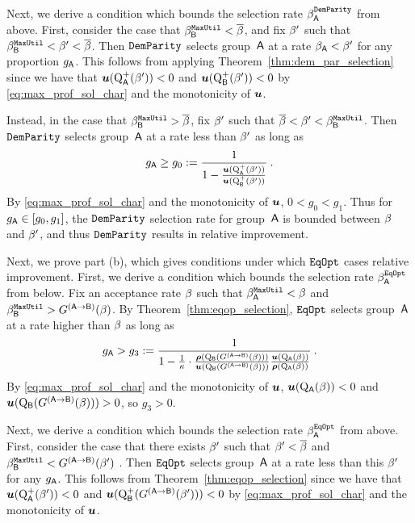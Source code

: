 		Next, we derive a condition which bounds the selection rate $\beta^{\mathtt{DemParity}}_{\mathsf{A}}$ from above. First, consider the case that $\beta_{\mathsf{B}}^{\mathtt{MaxUtil}}<\overline{\beta}$, and fix $\beta'$ such that $\beta_{\mathsf{B}}^{\mathtt{MaxUtil}}<\beta'<\overline{\beta}$. 
		Then $\mathtt{DemParity}$ selects group~$\mathsf{A}$ at a rate $\beta_{\mathsf{A}} < \beta'$ for any proportion $g_{\mathsf{A}}$. This follows from applying Theorem~\ref{thm:dem_par_selection} since we have that  $\boldsymbol{u}(\mathrm{Q}^+_{\mathsf{A}}(\beta'))<0$ and $\boldsymbol{u}(\mathrm{Q}^+_{\mathsf{B}}(\beta'))<0$ by \eqref{eq:max_prof_sol_char} and the monotonicity of $\boldsymbol{u}$. 

		Instead, in the case that $\beta_{\mathsf{B}}^{\mathtt{MaxUtil}}>\overline{\beta}$, fix $\beta'$ such that $\overline{\beta}<\beta'<\beta_{\mathsf{B}}^{\mathtt{MaxUtil}}$. Then $\mathtt{DemParity}$ selects group~$\mathsf{A}$ at a rate less than $\beta'$ as long as 
		\begin{align*}
		g_{\mathsf{A}}\geq g_0:=\frac{1}{1-\frac{\boldsymbol{u}(\mathrm{Q}^+_{\mathsf{A}}(\beta'))}{\boldsymbol{u}(\mathrm{Q}^+_{\mathsf{B}}(\beta'))}}\:.
		\end{align*} 
		By \eqref{eq:max_prof_sol_char} and the monotonicity of $\boldsymbol{u}$, $0<g_0<g_1$. Thus for $g_{\mathsf{A}}\in[g_0,g_1]$, the $\mathtt{DemParity}$ selection rate for group~$\mathsf{A}$ is bounded between $\beta$ and $\beta'$, and thus $\mathtt{DemParity}$ results in relative improvement.

		Next, we prove part (b), which gives conditions under which $\mathtt{EqOpt}$ cases relative improvement. First, we derive a condition which bounds the selection rate $\beta^{\mathtt{EqOpt}}_{\mathsf{A}}$ from below. Fix an acceptance rate $\beta$ such that $\beta_{\mathsf{A}}^{\mathtt{MaxUtil}}<\beta$ and $\beta_{\mathsf{B}}^{\mathtt{MaxUtil}} > G^{(\mathsf{A}\to\mathsf{B})}(\beta)$.  
		By Theorem~\ref{thm:eqop_selection}, $\mathtt{EqOpt}$ selects group~$\mathsf{A}$ at a rate higher than $\beta$ as long as
		\begin{align*}
		g_{\mathsf{A}}>g_3 := \frac{1}{1-\frac{1}{\kappa}\cdot\frac{\boldsymbol{\rho}(\mathrm{Q}_{\mathsf{B}}(G^{(\mathsf{A}\to\mathsf{B})}(\beta)))}{\boldsymbol{u}(\mathrm{Q}_{\mathsf{B}}(G^{(\mathsf{A}\to\mathsf{B})}(\beta)))}\frac{\boldsymbol{u}(\mathrm{Q}_{\mathsf{A}}(\beta))}{\boldsymbol{\rho}(\mathrm{Q}_{\mathsf{A}}(\beta))}}\:.
		\end{align*} 
		By \eqref{eq:max_prof_sol_char} and the monotonicity of $\boldsymbol{u}$, $\boldsymbol{u}(\mathrm{Q}_{\mathsf{A}}(\beta))<0$ and $\boldsymbol{u}(\mathrm{Q}_{\mathsf{B}}(G^{(\mathsf{A}\to\mathsf{B})}(\beta)))>0$, so $g_3>0$.

		Next, we derive a condition which bounds the selection rate $\beta^{\mathtt{EqOpt}}_{\mathsf{A}}$ from above. First, consider the case that there exists $\beta'$ such that $\beta'<\overline{\beta}$ and $\beta_{\mathsf{B}}^{\mathtt{MaxUtil}} < G^{(\mathsf{A}\to\mathsf{B})}(\beta')$ .
		Then $\mathtt{EqOpt}$ selects group~$\mathsf{A}$ at a rate less than this $\beta'$ for any $g_{\mathsf{A}}$. This follows from Theorem~\ref{thm:eqop_selection} since we have that  $\boldsymbol{u}(\mathrm{Q}^+_{\mathsf{A}}(\beta'))<0$ and $\boldsymbol{u}(\mathrm{Q}^+_{\mathsf{B}}(G^{(\mathsf{A}\to\mathsf{B})}(\beta')))<0$ by \eqref{eq:max_prof_sol_char} and the monotonicity of $\boldsymbol{u}$. 

